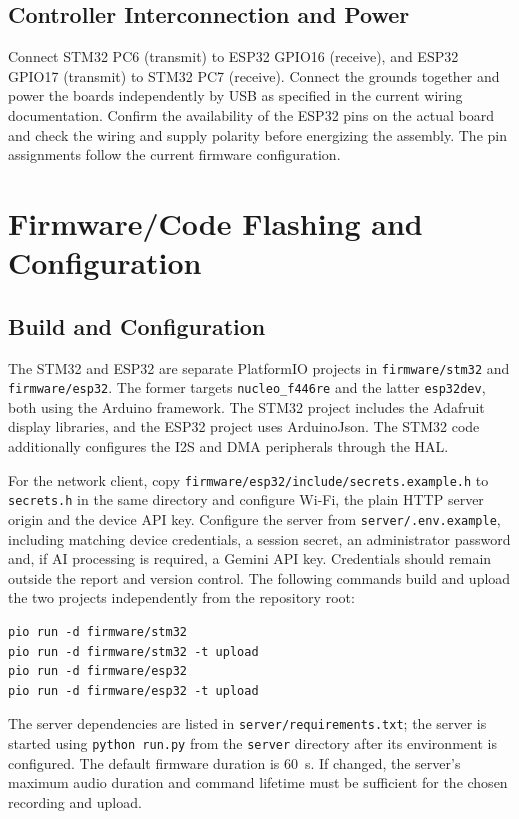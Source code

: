 \documentclass[a4paper,12pt,oneside]{report}
\begin{document}
\subsection{Controller Interconnection and Power}
Connect STM32 PC6 (transmit) to ESP32 GPIO16 (receive), and ESP32 GPIO17 (transmit) to STM32 PC7 (receive). Connect the grounds together and power the boards independently by USB as specified in the current wiring documentation. Confirm the availability of the ESP32 pins on the actual board and check the wiring and supply polarity before energizing the assembly. The pin assignments follow the current firmware configuration.

\section{Firmware/Code Flashing and Configuration}
\subsection{Build and Configuration}
The STM32 and ESP32 are separate PlatformIO projects in \texttt{firmware/stm32} and \texttt{firmware/esp32}. The former targets \texttt{nucleo\_f446re} and the latter \texttt{esp32dev}, both using the Arduino framework. The STM32 project includes the Adafruit display libraries, and the ESP32 project uses ArduinoJson. The STM32 code additionally configures the I2S and DMA peripherals through the HAL.

For the network client, copy \texttt{firmware/esp32/include/secrets.example.h} to \texttt{secrets.h} in the same directory and configure Wi-Fi, the plain HTTP server origin and the device API key. Configure the server from \texttt{server/.env.example}, including matching device credentials, a session secret, an administrator password and, if AI processing is required, a Gemini API key. Credentials should remain outside the report and version control. The following commands build and upload the two projects independently from the repository root:
\begin{verbatim}
pio run -d firmware/stm32
pio run -d firmware/stm32 -t upload
pio run -d firmware/esp32
pio run -d firmware/esp32 -t upload
\end{verbatim}
The server dependencies are listed in \texttt{server/requirements.txt}; the server is started using \texttt{python run.py} from the \texttt{server} directory after its environment is configured. The default firmware duration is 60~s. If changed, the server's maximum audio duration and command lifetime must be sufficient for the chosen recording and upload.
\end{document}
